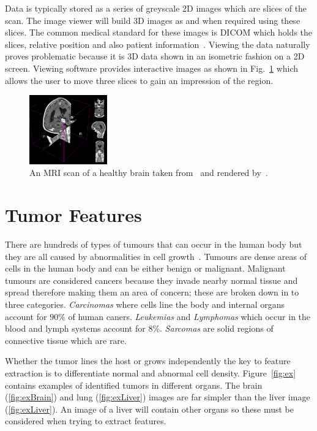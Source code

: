\documentclass[journal]{IEEEtran}
\begin{document}
Data is typically stored as a series of greyscale 2D images which are slices of the scan.
The image viewer will build 3D images as and when required using these slices.
The common medical standard for these images is DICOM which holds the slices, relative position and also patient information~\cite{dicom11nema}.
Viewing the data naturally proves problematic because it is 3D data shown in an isometric fashion on a 2D screen.
Viewing software provides interactive images as shown in Fig.~\ref{fig:3d} which allows the user to move three slices to gain an impression of the region.

\begin{figure}[!htb]
   \centering
   \includegraphics[width = 0.3\textwidth]{Figures/3Dview.png}
   \caption{An MRI scan of a healthy brain taken from~\cite{cia} and rendered by~\cite{slicer}.}
   \label{fig:3d}
\end{figure}












\section{Tumor Features}
\label{sec:tumor}

There are hundreds of types of tumours that can occur in the human body but they are all caused by abnormalities in cell growth~\cite{cooper1992cancer}.
Tumours are dense areas of cells in the human body and can be either benign or malignant.
Malignant tumours are considered cancers because they invade nearby normal tissue and spread therefore making them an area of concern; these are broken down in to three categories.
\emph{Carcinomas} where cells line the body and internal organs account for $90$\% of human caners.
\emph{Leukemias} and \emph{Lymphomas} which occur in the blood and lymph systems account for $8$\%.
\emph{Sarcomas} are solid regions of connective tissue which are rare.


Whether the tumor lines the host or grows independently the key to feature extraction is to differentiate normal and abnormal cell density. 
Figure~\ref{fig:ex} contains examples of identified tumors in different organs.
The brain (\ref{fig:exBrain}) and lung (\ref{fig:exLiver}) images are far simpler than the liver image (\ref{fig:exLiver}).
An image of a liver will contain other organs so these must be considered when trying to extract features.
\end{document}
